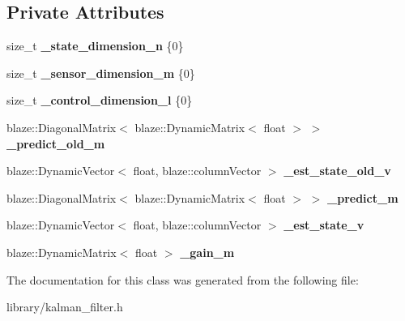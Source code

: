 \subsection*{Private Attributes}
\begin{DoxyCompactItemize}
\item 
\mbox{\label{classkafi_1_1kalman__filter_a9ca1c25515bab589b5b54fad1b71bd36}} 
size\+\_\+t {\bfseries \+\_\+state\+\_\+dimension\+\_\+n} \{0\}
\item 
\mbox{\label{classkafi_1_1kalman__filter_a5628d4071253bb2bd8575b595328bc7f}} 
size\+\_\+t {\bfseries \+\_\+sensor\+\_\+dimension\+\_\+m} \{0\}
\item 
\mbox{\label{classkafi_1_1kalman__filter_a3b6c0f819aee2d6e5e5f752c5f5f6d43}} 
size\+\_\+t {\bfseries \+\_\+control\+\_\+dimension\+\_\+l} \{0\}
\item 
\mbox{\label{classkafi_1_1kalman__filter_acbe3339eeed459ffbb0d1b3fbd464a8f}} 
blaze\+::\+Diagonal\+Matrix$<$ blaze\+::\+Dynamic\+Matrix$<$ float $>$ $>$ {\bfseries \+\_\+predict\+\_\+old\+\_\+m}
\item 
\mbox{\label{classkafi_1_1kalman__filter_aaa9735b382d91e09119200b1fd8b6571}} 
blaze\+::\+Dynamic\+Vector$<$ float, blaze\+::column\+Vector $>$ {\bfseries \+\_\+est\+\_\+state\+\_\+old\+\_\+v}
\item 
\mbox{\label{classkafi_1_1kalman__filter_aa4b0683be5dba96c0a549567fa6a3b87}} 
blaze\+::\+Diagonal\+Matrix$<$ blaze\+::\+Dynamic\+Matrix$<$ float $>$ $>$ {\bfseries \+\_\+predict\+\_\+m}
\item 
\mbox{\label{classkafi_1_1kalman__filter_ad2994738b4325a77c7f42367936eed03}} 
blaze\+::\+Dynamic\+Vector$<$ float, blaze\+::column\+Vector $>$ {\bfseries \+\_\+est\+\_\+state\+\_\+v}
\item 
\mbox{\label{classkafi_1_1kalman__filter_aa30a750c76d7fd945d11c77aba63506d}} 
blaze\+::\+Dynamic\+Matrix$<$ float $>$ {\bfseries \+\_\+gain\+\_\+m}
\end{DoxyCompactItemize}


The documentation for this class was generated from the following file\+:\begin{DoxyCompactItemize}
\item 
library/kalman\+\_\+filter.\+h\end{DoxyCompactItemize}
